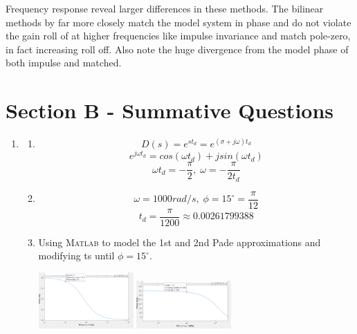 \documentclass[11pt]{article}
\newcommand{\matlab}{\textsc{Matlab }} %
\begin{document}
\begin{preview}
\begin{enumerate}
    Frequency response reveal larger differences in these methods. The bilinear methods by far more closely match the model system in phase and do not violate the gain roll of at higher frequencies like impulse invariance and match pole-zero, in fact increasing roll off. Also note the huge divergence from the model phase of both impulse and matched.
\end{enumerate}

\section*{Section B - Summative Questions}
\begin{enumerate}
    \item 
    \begin{enumerate}
        \item $$D(s)=e^{st_{d}} = e^{(\sigma+j\omega)t_{d}}$$
        $$e^{j\omega t_d} = cos(\omega t_d) + jsin(\omega t_d)$$
        $$\omega t_d = -\frac{\pi}{2},\; \omega = -\frac{\pi}{2t_d}$$
        \item $$\omega = 1000 rad/s, \; \phi=15^{\circ} = \frac{\pi}{12}$$
        $$t_d = \frac{\pi}{1200} \approx 0.00261799388$$
        \item Using \matlab to model the 1st and 2nd Pade approximations and modifying ts until $\phi=15^{\circ}$. 
            \begin{center}
                \includegraphics[width=0.3\textwidth]{fig/b1c_270u.png}
                \includegraphics[width=0.3\textwidth]{fig/b1c_2_261u.png}


\end{center}
\end{enumerate}
\end{enumerate}
\end{preview}
\end{document}
